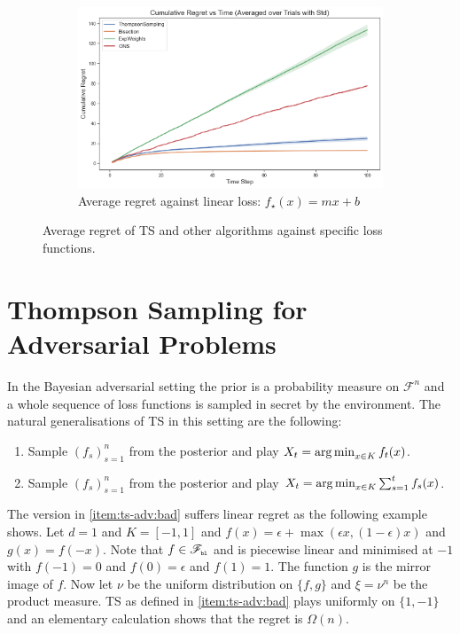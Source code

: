\documentclass[letter, 12pt]{report}
\newcommand{\pb}{\text{\tiny\texttt{b}}}
\newcommand{\pl}{\text{\tiny\texttt{l}}}
\newcommand{\argmin}{\operatornamewithlimits{arg\,min}}
\newcommand{\sF}{\mathscr F}
\newcommand{\1}{\mathbf{1}}
\newcommand{\ts}{\textsc{TS}\xspace}
\theoremstyle{plain}
\theoremstyle{definition}
\theoremstyle{remark}
\begin{document}
\begin{figure}[h!]
    \vspace{0.5em}
    \begin{subfigure}{10cm}
        \centering
        \includegraphics[width=\textwidth]{figures/linear_reg.png}
        \caption{Average regret against linear loss: $f_\star(x) = mx + b$}
        \label{fig:linear-loss-regret}
    \end{subfigure}
    \caption{Average regret of \ts and other algorithms against specific loss functions.}
    \label{fig:specific-losses-reg}
\end{figure}


\chapter{Thompson Sampling for Adversarial Problems}
\label{ch:ts-adv}
In the Bayesian adversarial setting the prior is a probability measure on $\sF^n$ and a whole sequence of loss functions is sampled in secret
by the environment.
The natural generalisations of \ts{} in this setting are the following:
\begin{enumerate}
    \item Sample $(f_s)_{s=1}^n$ from the posterior and play $X_t = \argmin_{x \in K} f_t(x)$. \label{item:ts-adv:bad}
    \item Sample $(f_s)_{s=1}^n$ from the posterior and play $X_t = \argmin_{x \in K} \sum_{s=1}^t f_s(x)$. \label{item:ts-adv:ok}
\end{enumerate}
The version in \ref{item:ts-adv:bad} suffers linear regret as the following example shows.
Let $d = 1$ and $K = [-1,1]$ and $f(x) = \epsilon + \max(\epsilon x, (1 - \epsilon) x)$ and $g(x) = f(-x)$.
Note that $f \in \sF_{\pb\pl}$ and is piecewise linear and minimised at $-1$ with $f(-1) = 0$ and $f(0) = \epsilon$ and $f(1) = 1$.
The function $g$ is the mirror image of $f$.
Now let $\nu$ be the uniform distribution on $\{f, g\}$ and $\xi = \nu^n$ be the product measure.
\ts{} as defined in \ref{item:ts-adv:bad} plays uniformly on $\{1, -1\}$ and an elementary calculation shows that the regret
is $\Omega(n)$.
\end{document}

